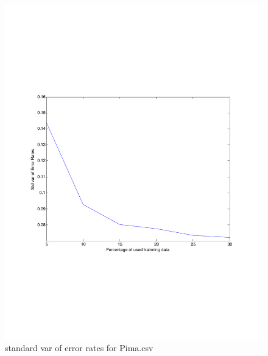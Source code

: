 \documentclass[12pt]{amsart}
\begin{document}
\begin{figure}[H]
\centering
        \includegraphics[totalheight=18cm]{Pima_std_rogReg.pdf}
    \caption{standard var of error rates for Pima.csv}
    \label{fig:verticalcell2}
\end{figure}
\end{document}
